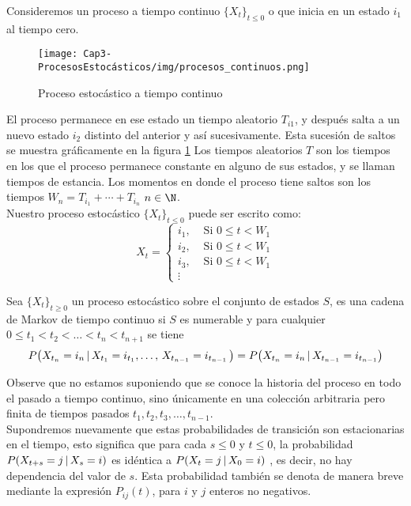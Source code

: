 Consideremos un proceso a tiempo continuo $\{X_t\}_{t\leq 0}$ o que inicia en un estado $i_1$  al tiempo cero.
\begin{figure}
    \centering
    \texttt{[image: Cap3-ProcesosEstocásticos/img/procesos\_continuos.png]}
    \caption{Proceso estocástico a tiempo continuo}
    \label{fig-procEstocastContinuo}
\end{figure}
El proceso permanece en ese estado un tiempo aleatorio $T_{i 1}$, y
después salta a un nuevo estado $i_2$ distinto del anterior y así sucesivamente. Esta
sucesión de saltos se muestra gráficamente en la figura \ref{fig-procEstocastContinuo}
Los tiempos aleatorios $T$ son los tiempos
en los que el proceso permanece constante en alguno de sus estados, y se llaman tiempos de estancia.
Los momentos en donde el proceso tiene saltos son los tiempos $W_n=T_{i_1}+\cdots+T_{i_n}$ $n\in\N$.\\
Nuestro proceso estocástico $\{X_t\}_{t\leq 0}$ puede ser escrito como:
 $$X_t =
 \begin{cases}
    i_1, & \mbox{ Si $0\leq t <W_1$}\\
    i_2, & \mbox{ Si $0\leq t <W_1$}\\
    i_3, & \mbox{ Si $0\leq t <W_1$}\\
    \vdots
 \end{cases}$$
\begin{Def}
    Sea $\{X_t\}_{t\geq 0}$ un proceso estocástico sobre el conjunto de estados $S$, es una cadena de Markov de tiempo continuo si $S$ es numerable y para cualquier $0\leq t_1<t_2<\ldots<t_n<t_{n+1}$ se tiene  $$P\big(X_{t_n}=i_n\thinspace|\thinspace X_{t_1}=i_{t_1},\ldots ,\thinspace X_{t_{n-1}}=i_{t_{n-1}}\thinspace \big)=P\big(X_{t_n}=i_n\thinspace|\thinspace X_{t_{n-1}}=i_{t_{n-1}}\big)$$
\end{Def}
Observe que no estamos suponiendo que se conoce la historia del proceso en todo el pasado a tiempo continuo, sino únicamente en una colección arbitraria pero finita de tiempos pasados $t_1,t_2,t_3,\ldots,t_{n-1}$.\\
Supondremos nuevamente que estas probabilidades de transición son estacionarias en el tiempo, esto significa que para cada $s\leq 0$ y $t\leq 0$, la probabilidad $P(X_{t+s} =j \thinspace|\thinspace X_s= i)$ 
es idéntica a $P(X _{t} =j \thinspace|\thinspace X_0= i)$ , es decir, no hay dependencia del valor de $s$.
Esta probabilidad también se denota de manera breve mediante la expresión $P_{i j}(t)$, para $i$ y $j$ enteros no negativos.\\
